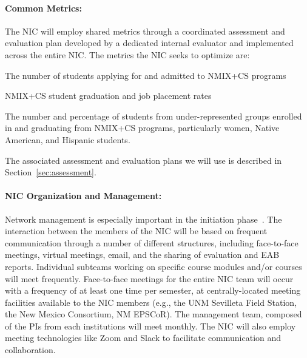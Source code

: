 \paragraph{Common Metrics:} The NIC will employ shared metrics through a coordinated assessment and evaluation plan developed by a dedicated internal evaluator and implemented across the entire NIC. The metrics the NIC seeks to optimize are:
\begin{tightitemize}
\item The number of students applying for and admitted to NMIX+CS programs
\item NMIX+CS student graduation and job placement rates 
\item The number and percentage of students from under-represented groups enrolled in and 
graduating from NMIX+CS programs, particularly women, Native American, and Hispanic students.
\end{tightitemize}
The associated assessment and evaluation plans we will use is described in Section~\ref{sec:assessment}.

\paragraph{NIC Organization and Management:} Network management is especially important in the initiation phase~\cite{nic1}. The interaction between the members of the NIC will be based on frequent communication through a number of different structures, including face-to-face meetings, virtual meetings, email, and the sharing of evaluation and EAB reports. Individual subteams working on specific course modules and/or courses will meet frequently. Face-to-face meetings for the entire NIC team will occur with a frequency of at least one time per semester, at centrally-located meeting facilities available to the NIC members (e.g., the UNM Sevilleta Field Station, the New Mexico Consortium, NM EPSCoR). The management team, composed of the PIs from each institutions will meet monthly. The NIC will also employ meeting technologies like Zoom and Slack to facilitate communication and collaboration.
